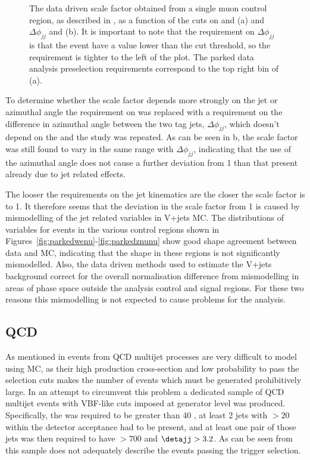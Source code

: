 \begin{figure}
  \caption{The data driven scale factor obtained from a single muon control region, as described in , as a function of the cuts on \jetmetdphi and \Mjj (a) and $\Delta\phi_{jj}$ and \Mjj (b). It is important to note that the requirement on $\Delta\phi_{jj}$ is that the event have a value lower than the cut threshold, so the requirement is tighter to the left of the plot. The parked data analysis preselection requirements correspond to the top right bin of (a).}
  \label{fig:jetmetdphimjjscalefactor}
\end{figure}

To determine whether the scale factor depends more strongly on the jet or \METnoMU azimuthal angle the requirement on \jetmetdphi was replaced with a requirement on the difference in azimuthal angle between the two tag jets, $\Delta\phi_{jj}$, which doesn't depend on the \METnoMU and the study was repeated. As can be seen in b, the scale factor was still found to vary in the same range with $\Delta\phi_{jj}$, indicating that the use of the \METnoMU azimuthal angle does not cause a further deviation from 1 than that present already due to jet related effects.

The looser the requirements on the jet kinematics are the closer the scale factor is to 1. It therefore seems that the deviation in the scale factor from 1 is caused by mismodelling of the jet related variables in V+jets \ac{MC}. The distributions of variables for events in the various control regions shown in Figures~\ref{fig:parkedwenu}-\ref{fig:parkedznunu} show good shape agreement between data and \ac{MC}, indicating that the shape in these regions is not significantly mismodelled. Also, the data driven methods used to estimate the V+jets background correct for the overall normalisation difference from mismodelling in areas of phase space outside the analysis control and signal regions. For these two reasons this mismodelling is not expected to cause problems for the analysis.

\subsection{QCD}
\label{sec:parkedQCD}
As mentioned in  events from \ac{QCD} multijet processes are very difficult to model using \ac{MC}, as their high production cross-section and low probability to pass the selection cuts makes the number of events which must be generated prohibitively large. In an attempt to circumvent this problem a dedicated sample of \ac{QCD} multijet events with \ac{VBF}-like cuts imposed at generator level was produced. Specifically, the \MET was required to be greater than 40 \GeV, at least 2 jets with \pt$>20$ within the detector acceptance had to be present, and at least one pair of those jets was then required to have \Mjj$>700$ \GeV and $\detajj>3.2$. As can be seen from  this sample does not adequately describe the events passing the trigger selection.

